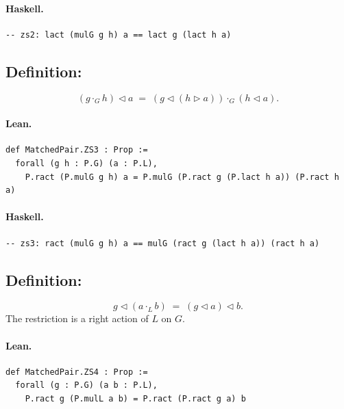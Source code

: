 \documentclass[11pt,a4paper]{article}
\begin{document}
\paragraph{Haskell.}
\begin{lstlisting}[style=haskell]
-- zs2: lact (mulG g h) a == lact g (lact h a)
\end{lstlisting}


\subsection{Definition: }

\begin{defn}
\[
  (g \cdot_G h) \triangleleft a
  \;=\;
  (g \triangleleft (h \triangleright a)) \cdot_G (h \triangleleft a).
\]
\end{defn}

\paragraph{Lean.}
\begin{lstlisting}[style=lean]
def MatchedPair.ZS3 : Prop :=
  forall (g h : P.G) (a : P.L),
    P.ract (P.mulG g h) a = P.mulG (P.ract g (P.lact h a)) (P.ract h a)
\end{lstlisting}

\paragraph{Haskell.}
\begin{lstlisting}[style=haskell]
-- zs3: ract (mulG g h) a == mulG (ract g (lact h a)) (ract h a)
\end{lstlisting}


\subsection{Definition: }

\begin{defn}
\[
  g \triangleleft (a \cdot_L b)
  \;=\;
  (g \triangleleft a) \triangleleft b.
\]
The restriction is a right action of $L$ on $G$.
\end{defn}

\paragraph{Lean.}
\begin{lstlisting}[style=lean]
def MatchedPair.ZS4 : Prop :=
  forall (g : P.G) (a b : P.L),
    P.ract g (P.mulL a b) = P.ract (P.ract g a) b
\end{lstlisting}
\end{document}
